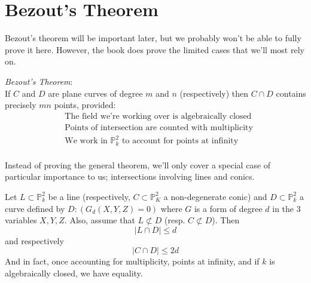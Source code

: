\section{Bezout's Theorem}
Bezout's theorem will be important later, but we
probably won't be able to fully prove it here. However,
the book does prove the limited cases that we'll most rely on.

\begin{theorem}
\emph{Bezout's Theorem}:\\

If $C$ and $D$ are plane curves of degree $m$ and $n$ (respectively)
then $C \cap D$ contains precisely $mn$ points, provided:
\begin{align*}
&\text{The field we're working over is algebraically closed} \tag{i}\\
&\text{Points of intersection are counted with multiplicity} \tag{ii}\\
&\text{We work in $\mathbb{P}^2_k$ to account for points at infinity} \tag{iii}\\
\end{align*}
\end{theorem}

Instead of proving the general theorem, we'll only cover a special 
case of particular importance to us; intersections involving
lines and conics.

\begin{theorem}
Let $L \subset \mathbb{P}^2_k$ be a line (respectively, $C \subset \mathbb{P}^2_K$ a non-degenerate conic)
and $D \subset \mathbb{P}^2_k$ a curve defined by $D:(G_d(X,Y,Z)=0)$ where $G$ is
a form of degree $d$ in the 3 variables $X,Y,Z$. Also, assume that $L \not\subset D$ (resp. $C \not\subset D$).
Then
\[
|L \cap D| \le d
\]
and respectively
\[
|C \cap D| \le 2d
\]
And in fact, once accounting for multiplicity, points at infinity, and if $k$ is algebraically
closed, we have equality.
\end{theorem}

